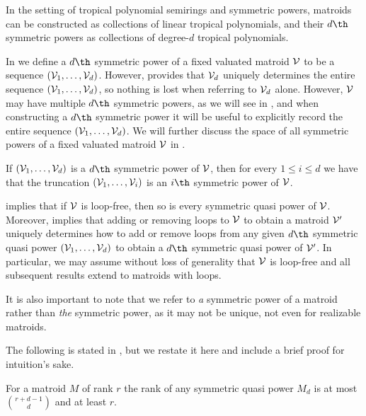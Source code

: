 In the setting of tropical polynomial semirings and symmetric powers, matroids can be constructed as collections of linear tropical polynomials, and their $d\th$ symmetric powers as collections of degree-$d$ tropical polynomials.

\begin{remark}
In  we define a $d\th$ symmetric power of a fixed valuated matroid $\mathcal{V}$ to be a sequence $(\mathcal{V}_1,\dots,\mathcal{V}_d)$. However,  provides that $\mathcal{V}_d$ uniquely determines the entire sequence $(\mathcal{V}_1,\dots,\mathcal{V}_d)$, so nothing is lost when referring to $\mathcal{V}_d$ alone. However, $\mathcal{V}$ may have multiple $d\th$ symmetric powers, as we will see in , and when constructing a $d\th$ symmetric power it will be useful to explicitly record the entire sequence $(\mathcal{V}_1,\dots,\mathcal{V}_d)$. We will further discuss the space of all symmetric powers of a fixed valuated matroid $\mathcal{V}$ in .
\end{remark}

\begin{remark}\label{rem:truncation}
If $(\mathcal{V}_1,\dots,\mathcal{V}_d)$ is a $d\th$ symmetric power of $\mathcal{V}$, then for every $1\leq i\leq d$ we have that the truncation $(\mathcal{V}_1,\dots,\mathcal{V}_i)$ is an $i\th$ symmetric power of $\mathcal{V}$.
\end{remark}



\begin{remark}\label{rem:loopless}
 implies that if $\mathcal{V}$ is loop-free, then so is every symmetric quasi power of $\mathcal{V}$. Moreover,  implies that adding or removing loops to $\mathcal{V}$ to obtain a matroid $\mathcal{V}'$ uniquely determines how to add or remove loops from any given $d\th$ symmetric quasi power $(\mathcal{V}_1,\dots,\mathcal{V}_d)$ to obtain a $d\th$ symmetric quasi power of $\mathcal{V}'$. In particular, we may assume without loss of generality that $\mathcal{V}$ is loop-free and all subsequent results extend to matroids with loops.
\end{remark}

It is also important to note that we refer to \textit{a} symmetric power of a matroid rather than \textit{the} symmetric power, as it may not be unique, not even for realizable matroids.

The following is stated in \cite{MGlueing}, but we restate it here and include a brief proof for intuition's sake.

\begin{proposition}\cite{MGlueing}\label{prop:masonFullRank}
    For a matroid $M$ of rank $r$ the rank of any symmetric quasi power $M_d$ is at most $\binom{r+d-1}{d}$ and at least $r$.
\end{proposition}

